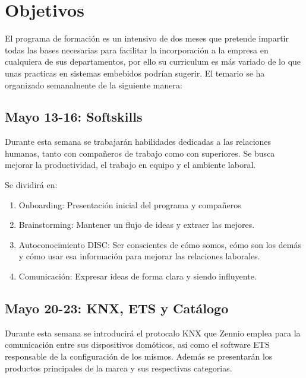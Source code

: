 \chapter{Objetivos}
\label{ch:objetivos}

El programa de formación es un intensivo de dos meses que pretende impartir todas las bases necesarias para facilitar la incorporación a la empresa en cualquiera de sus departamentos, por ello su curriculum es más variado de lo que unas practicas en sistemas embebidos podrían sugerir. El temario se ha organizado semanalnente de la siguiente manera:

\section*{Mayo 13-16: Softskills}
\label{sec:may13-16}

Durante esta semana se trabajarán habilidades dedicadas a las relaciones humanas, tanto con compañeros de trabajo como con superiores. Se busca mejorar la productividad, el trabajo en equipo y el ambiente laboral.

Se dividirá en:
\begin{enumerate}
    \item Onboarding: Presentación inicial del programa y compañeros
    \item Brainstorming: Mantener un flujo de ideas y extraer las mejores.
    \item Autoconocimiento DISC: Ser conscientes de cómo somos, cómo son los demás y cómo usar esa información para mejorar las relaciones laborales.
    \item Comunicación: Expresar ideas de forma clara y siendo influyente.
\end{enumerate}


\section*{Mayo 20-23: KNX, ETS y Catálogo}
\label{sec:may20-23}

Durante esta semana se introducirá el protocalo KNX que Zennio emplea para la comunicación entre sus dispositivos domóticos, así como el software ETS responsable de la configuración de los mismos. Además se presentarán los productos principales de la marca y sus respectivas categorias.

